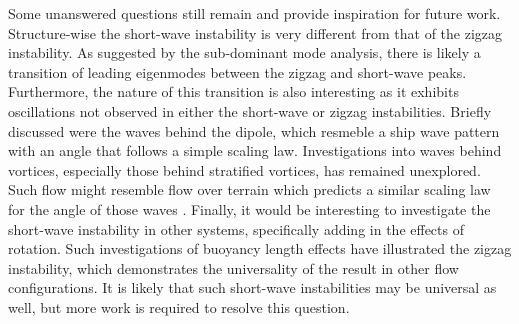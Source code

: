 Some unanswered questions still remain and provide inspiration for future work. Structure-wise the short-wave instability is very different from that of the zigzag instability. As suggested by the sub-dominant mode analysis, there is likely a transition of leading eigenmodes between the zigzag and short-wave peaks. Furthermore, the nature of this transition is also interesting as it exhibits oscillations not observed in either the short-wave or zigzag instabilities. Briefly discussed were the waves behind the dipole, which resmeble a ship wave pattern with an angle that follows a simple scaling law. Investigations into waves behind vortices, especially those behind stratified vortices, has remained unexplored. Such flow might resemble flow over terrain which predicts a similar scaling law for the angle of those waves \cite{sharman1983ship}. Finally, it would be interesting to investigate the short-wave instability in other systems, specifically adding in the effects of rotation. Such investigations of buoyancy length effects have illustrated the zigzag instability, which demonstrates the universality of the result in other flow configurations. It is likely that such short-wave instabilities may be universal as well, but more work is required to resolve this question. 

